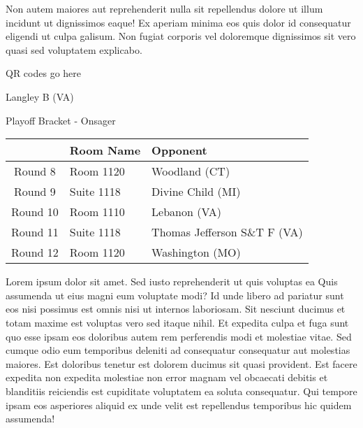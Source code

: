 \documentclass{article}%
\begin{document}
\newline%
Non autem maiores aut reprehenderit nulla sit repellendus dolore ut illum incidunt ut dignissimos eaque! Ex aperiam minima eos quis dolor id consequatur eligendi ut culpa galisum. Non fugiat corporis vel doloremque dignissimos sit vero quasi sed voluptatem explicabo.\newline%
\newline%
%
\vspace*{30pt}%
\begin{center}%
\begin{Huge}%
QR codes go here%
\end{Huge}%
\end{center}%
\newpage%
\begin{center}%
\begin{Huge}%
Langley B (VA)%
\end{Huge}%
\vspace*{8pt}%
\linebreak%
\begin{Large}%
Playoff Bracket {-} Onsager%
\end{Large}%
\end{center}%
\begin{tabularx}{\textwidth}{|c|Y|Y|}%
\hline%
&Room Name&Opponent\\%
\hline%
Round 8&Room 1120&Woodland (CT)\\%
Round 9&Suite 1118&Divine Child (MI)\\%
Round 10&Room 1110&Lebanon (VA)\\%
Round 11&Suite 1118&Thomas Jefferson S\&T F (VA)\\%
Round 12&Room 1120&Washington (MO)\\%
\hline%
\end{tabularx}%
\vspace*{8pt}%
\linebreak%
\newline%
\newline%
Lorem ipsum dolor sit amet. Sed iusto reprehenderit ut quis voluptas ea Quis assumenda ut eius magni eum voluptate modi? Id unde libero ad pariatur sunt eos nisi possimus est omnis nisi ut internos laboriosam. Sit nesciunt ducimus et totam maxime est voluptas vero sed itaque nihil. Et expedita culpa et fuga sunt quo esse ipsam eos doloribus autem rem perferendis modi et molestiae vitae.\newline%
\newline%
Sed cumque odio eum temporibus deleniti ad consequatur consequatur aut molestias maiores. Est doloribus tenetur est dolorem ducimus sit quasi provident. Est facere expedita non expedita molestiae non error magnam vel obcaecati debitis et blanditiis reiciendis est cupiditate voluptatem ea soluta consequatur. Qui tempore ipsam eos asperiores aliquid ex unde velit est repellendus temporibus hic quidem assumenda!\newline%
\end{document}
